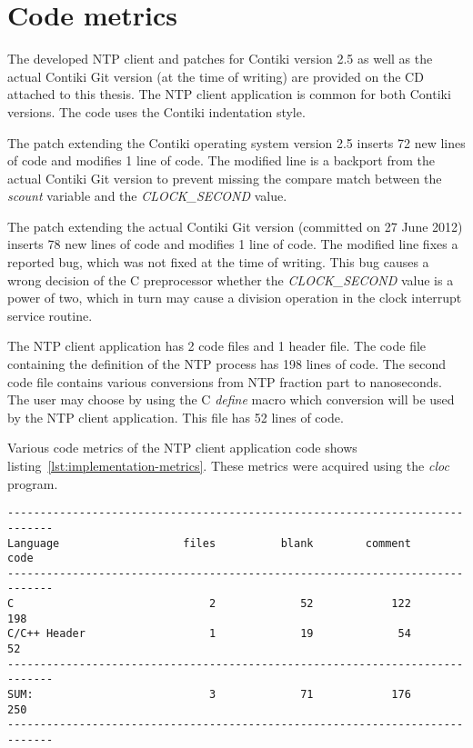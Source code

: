 
\section{Code metrics}
The developed NTP client and patches for Contiki version 2.5
as well as the actual Contiki Git version (at the time of writing)
are provided on the CD attached to this thesis.
The NTP client application is common for both Contiki versions.
The code uses the Contiki indentation style.

The patch extending the Contiki operating system version 2.5
inserts 72 new lines of code and modifies 1 line of code.
The modified line is a backport from the actual Contiki Git version to prevent
missing the compare match between the {\it{scount}} variable and
the {\it{CLOCK\_SECOND}} value.

The patch extending the actual Contiki Git version
(committed on 27 June 2012) 
inserts 78 new lines of code and modifies 1 line of code.
The modified line fixes a reported bug, which was not fixed at the time of writing.
This bug causes a wrong decision of the C preprocessor whether the {\it{CLOCK\_SECOND}}
value is a power of two, which in turn may cause a division operation in
the clock interrupt service routine.

The NTP client application has 2 code files and 1 header file.
The code file containing the definition of the NTP process
has 198 lines of code.
The second code file contains various conversions from NTP fraction part
to nanoseconds.
The user may choose by using the C {\it{define}} macro which conversion will be used
by the NTP client application.
This file has 52 lines of code.

Various code metrics of the NTP client application code
shows listing~\ref{lst:implementation-metrics}.
These metrics were acquired using the {\it{cloc}} program.
\begin{lstlisting}[caption={NTP client application code metrics},label={lst:implementation-metrics}]
-----------------------------------------------------------------------------
Language                   files          blank        comment           code
-----------------------------------------------------------------------------
C                              2             52            122            198
C/C++ Header                   1             19             54             52
-----------------------------------------------------------------------------
SUM:                           3             71            176            250
-----------------------------------------------------------------------------
\end{lstlisting}
